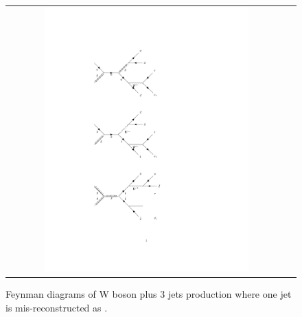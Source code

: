 \begin{figure}[tbh!]
	\centering
	\begin{tabular}{cc}
		\includegraphics[width=0.75\textwidth]{diagrams/pics/background_W3jets.pdf}
	\end{tabular}
	\caption{Feynman diagrams of W boson plus 3 jets production where one jet is mis-reconstructed as \hadtau. }
	\label{fig:background_W3jets}
\end{figure}

\clearpage
